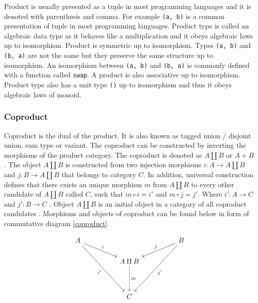 \documentclass[article]{aaltoseries}
\begin{document}
    Product is usually presented as a tuple in most programming languages and it
    is denoted with parenthesis and comma. For example \lstinline|(a, b)| is a
    common presentation of tuple in most programming languages. Product type is
    called an algebraic data type as it behaves like a multiplication and it
    obeys algebraic laws up to isomorphism. Product is symmetric up to
    isomorphism. Types \lstinline|(a, b)| and \lstinline|(b, a)| are not the
    same but they preserve the same structure up to isomorphism. An isomorphism
    between \lstinline|(a, b)| and \lstinline|(b, a)| is commonly defined with a
    function called \lstinline|swap|. A product is also associative up to
    isomorphism. Product type also has a unit type \lstinline|()| up to
    isomorphism and thus it obeys algebraic laws of monoid.


  \subsubsection{Coproduct}
    Coproduct is the dual of the product. It is also known as tagged union /
    disjoint union, sum type or variant. The coproduct can be constructed by
    inverting the morphisms of the product category. The coproduct is denoted as
    $A \amalg B$ or $A + B$. The object $A \amalg B$ is constructed from two
    injection morphisms $i : A \rightarrow A \amalg B$ and $j : B \rightarrow A
    \amalg B$ that belongs to category $C$. In addition, universal construction
    defines that there exists an unique morphism $m$ from $A \amalg B$ to every
    other candidate of $A \amalg B$ called $C$, such that $m \circ i = i'$ and
    $m \circ j = j'$. Where $i' : A \rightarrow C$ and $j' : B \rightarrow C$
    \cite{barr1990category, pierce1991basic}. Object $A \amalg B$ is an initial
    object in a category of all coproduct candidates \cite{pierce1991basic}.
    Morphisms and objects of coproduct can be found below in form of commutative
    diagram \ref{coproduct}.

    \begin{equation}
      \label{coproduct}
      \begin{tikzcd}[row sep=huge, column sep=huge]
        A \arrow[dr, "i"]
        \arrow[ddr, "i'"']
        &
        & B \arrow[dl, "j"']
        \arrow[ddl, "j'"] \\
        [-2em] & A \amalg B \arrow[d, dashed, "m"]
        & \\
        & C
        &
      \end{tikzcd}
    \end{equation}
\end{document}
